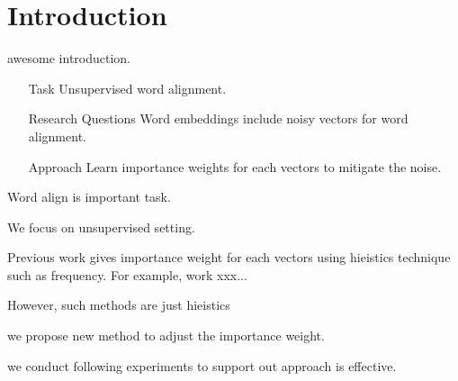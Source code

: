 \section{Introduction}
	awesome introduction.
	\begin{itemize}
		\item[Task]{Unsupervised word alignment.}
		\item[Research Questions]{Word embeddings include noisy vectors for word alignment.}
		\item[Approach]{Learn importance weights for each vectors to mitigate the noise.}
	\end{itemize}

	Word align is important task.

	We focus on unsupervised setting.


	Previous work gives importance weight for each vectors
		using hieistics technique such as frequency.
	For example, work xxx...


	However, such methods are just hieistics

	we propose new method to adjust the importance weight.

	we conduct following experiments to support out approach is effective.

	

